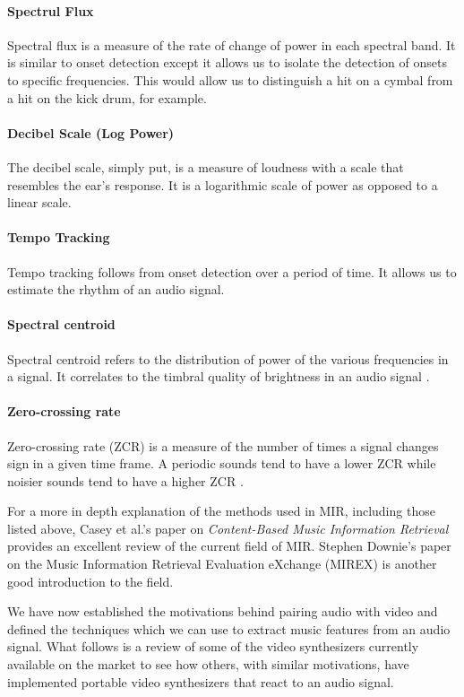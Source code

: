 \documentclass[../initial_thesis.tex]{subfiles}
\begin{document}
\paragraph{Spectrul Flux}
Spectral flux is a measure of the rate of change of power in each spectral band. It is similar to onset detection except it allows us to isolate the detection of onsets to specific frequencies. This would allow us to distinguish a hit on a cymbal from a hit on the kick drum, for example.

\paragraph{Decibel Scale (Log Power)}
The decibel scale, simply put, is a measure of loudness with a scale that resembles the ear's response. It is a logarithmic scale of power as opposed to a linear scale.

\paragraph{Tempo Tracking}
Tempo tracking follows from onset detection over a period of time. It allows us to estimate the rhythm of an audio signal.

\paragraph{Spectral centroid}
Spectral centroid refers to the distribution of power of the various frequencies in a signal. It correlates to the timbral quality of brightness in an audio signal \cite{Schubert}.

\paragraph{Zero-crossing rate}
Zero-crossing rate (ZCR) is a measure of the number of times a signal changes sign in a given time frame. A periodic sounds tend to have a lower ZCR while noisier sounds tend to have a higher ZCR \cite{Peeters2004}.

\vspace{\baselineskip}

For a more in depth explanation of the methods used in MIR, including those listed above, Casey et al.'s paper on \textit{Content-Based Music Information Retrieval} \cite{Casey2008} provides an excellent review of the current field of MIR. Stephen Downie's paper \cite{Downie} on the Music Information Retrieval Evaluation eXchange (MIREX) is another good introduction to the field. \par

We have now established the motivations behind pairing audio with video and defined the techniques which we can use to extract music features from an audio signal. What follows is a review of some of the video synthesizers currently available on the market to see how others, with similar motivations, have implemented portable video synthesizers that react to an audio signal.

\end{document}
